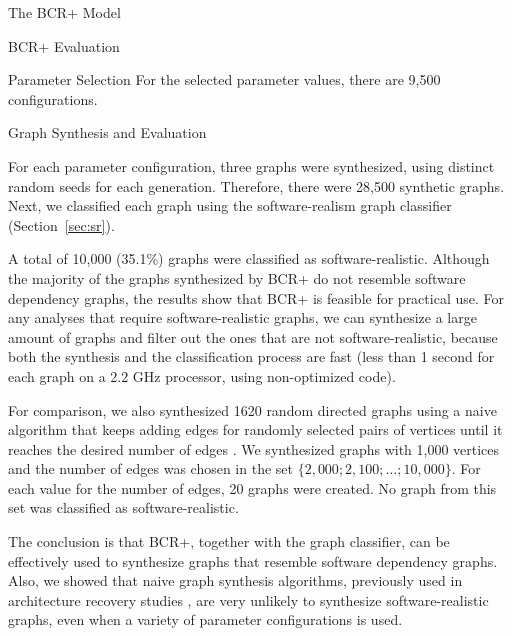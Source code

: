 \documentclass[11pt,twocolumn,a4paper,english]{article}
\begin{document}
\begin{section}{The BCR+ Model}
\begin{subsection}{BCR+ Evaluation}
\begin{subsubsection}{Parameter Selection}
	For the selected parameter values, there are 9,500 configurations.

\end{subsubsection}

\begin{subsubsection}{Graph Synthesis and Evaluation} \label{sec:bcr-synthesis}
	
	For each parameter configuration, three graphs were synthesized, using distinct random seeds for each generation. Therefore, there were 28,500 synthetic graphs. Next, we classified each graph using the software-realism graph classifier (Section~\ref{sec:sr}).

	
	A total of 10,000 (35.1\%) graphs were classified as software-realistic. Although the majority of the graphs synthesized by BCR+ do not resemble software dependency graphs, the results show that BCR+ is feasible for practical use. For any analyses that require software-realistic graphs, we can synthesize a large amount of graphs and filter out the ones that are not software-realistic, because both the synthesis and the classification process are fast (less than 1 second for each graph on a 2.2 GHz processor, using non-optimized code).

	For comparison, we also synthesized 1620 random directed graphs using a naive algorithm that keeps adding edges for randomly selected pairs of vertices until it reaches the desired number of edges \cite{Erdos1959}. We synthesized graphs with 1,000 vertices and the number of edges was chosen in the set $\{2,000; 2,100; \ldots ; 10,000\}$. For each value for the number of edges, 20 graphs were created. No graph from this set was classified as software-realistic. 
	
	The conclusion is that BCR+, together with the graph classifier, can be effectively used to synthesize graphs that resemble software dependency graphs. Also, we showed that naive graph synthesis algorithms, previously used in architecture recovery studies \cite{Mitchell2007}, are very unlikely to synthesize software-realistic graphs, even when a variety of parameter configurations is used.
	

\end{subsubsection}
\end{subsection}
\end{section}
\end{document}
